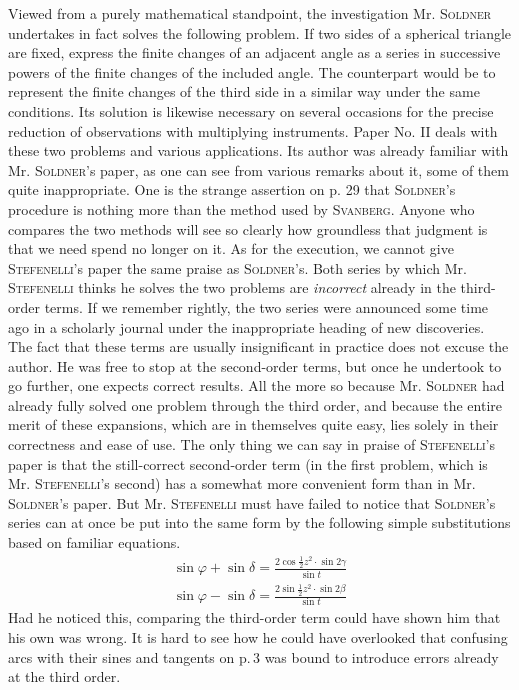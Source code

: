 Viewed from a purely mathematical standpoint, the investigation Mr. \textsc{Soldner} undertakes in fact solves the following problem. If two sides of a spherical triangle are fixed, express the finite changes of an adjacent angle as a series in successive powers of the finite changes of the included angle. The counterpart would be to represent the finite changes of the third side in a similar way under the same conditions. Its solution is likewise necessary on several occasions for the precise reduction of observations with multiplying instruments. Paper No. II deals with these two problems and various applications. Its author was already familiar with Mr. \textsc{Soldner}'s paper, as one can see from various remarks about it, some of them quite inappropriate. One is the strange assertion on p. 29 that \textsc{Soldner}'s procedure is nothing more than the method used by \textsc{Svanberg}. Anyone who compares the two methods will see so clearly how groundless that judgment is that we need spend no longer on it. As for the execution, we cannot give \textsc{Stefenelli}'s paper the same praise as \textsc{Soldner}'s. Both series by which Mr. \textsc{Stefenelli} thinks he solves the two problems are \emph{incorrect} already in the third-order terms. If we remember rightly, the two series were announced some time ago in a scholarly journal under the inappropriate heading of new discoveries. The fact that these terms are usually insignificant in practice does not excuse the author. He was free to stop at the second-order terms, but once he undertook to go further, one expects correct results. All the more so because Mr. \textsc{Soldner} had already fully solved one problem through the third order, and because the entire merit of these expansions, which are in themselves quite easy, lies solely in their correctness and ease of use. The only thing we can say in praise of \textsc{Stefenelli}'s paper is that the still-correct second-order term (in the first problem, which is Mr. \textsc{Stefenelli}'s second) has a somewhat more convenient form than in Mr. \textsc{Soldner}'s paper. But Mr. \textsc{Stefenelli} must have failed to notice that \textsc{Soldner}'s series can at once be put into the same form by the following simple substitutions based on familiar equations.
\[
\begin{gathered}
\sin\varphi+\sin\delta=\frac{2\cos\frac{1}{2}z^2\cdot\sin2\gamma}{\sin t}\\[5pt]
\sin\varphi-\sin\delta=\frac{2\sin\frac{1}{2}z^2\cdot\sin2\beta}{\sin t}
\end{gathered}
\]
Had he noticed this, comparing the third-order term could have shown him that his own was wrong. It is hard to see how he could have overlooked that confusing arcs with their sines and tangents on p.\,3 was bound to introduce errors already at the third order.


